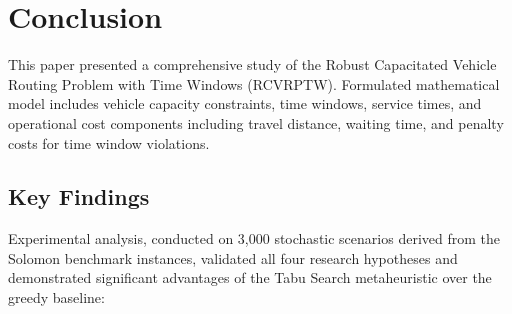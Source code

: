 \section{Conclusion}

This paper presented a comprehensive study of the Robust Capacitated Vehicle Routing Problem with Time Windows (RCVRPTW). Formulated mathematical model includes vehicle capacity constraints, time windows, service times, and operational cost components including travel distance, waiting time, and penalty costs for time window violations.

\subsection{Key Findings}

Experimental analysis, conducted on 3,000 stochastic scenarios derived from the Solomon benchmark instances, validated all four research hypotheses and demonstrated significant advantages of the Tabu Search metaheuristic over the greedy baseline:

